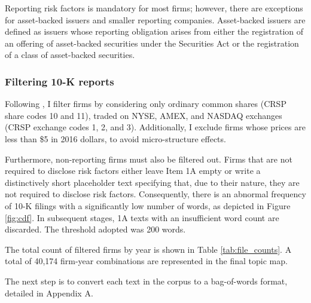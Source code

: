 \documentclass[12pt, letterpaper]{article}
\begin{document}
Reporting risk factors is mandatory for most firms; however, there are exceptions for asset-backed issuers and smaller reporting companies. Asset-backed issuers are defined as issuers whose reporting obligation arises from either the registration of an offering of asset-backed securities under the Securities Act or the registration of a class of asset-backed securities. 

\subsubsection{Filtering 10-K reports}
\label{sec:filt10k}
Following \cite{Golubov2019-ku, Stambaugh2016-eb}, I filter firms by considering only ordinary common shares (CRSP share codes 10 and 11), traded on NYSE, AMEX, and NASDAQ exchanges (CRSP exchange codes 1, 2, and 3). Additionally, I exclude firms whose prices are less than \$5 in 2016 dollars, to avoid micro-structure effects. 

Furthermore, non-reporting firms must also be filtered out. Firms that are not required to disclose risk factors either leave Item 1A empty or write a distinctively short placeholder text specifying that, due to their nature, they are not required to disclose risk factors. Consequently, there is an abnormal frequency of 10-K filings with a significantly low number of words, as depicted in Figure \ref{fig:cdf}. In subsequent stages, 1A texts with an insufficient word count are discarded. The threshold adopted was 200 words. 

The total count of filtered firms by year is shown in Table \ref{tab:file_counts}. A total of 40,174 firm-year combinations are represented in the final topic map.

The next step is to convert each text in the corpus to a bag-of-words format, detailed in Appendix A.
\end{document}
